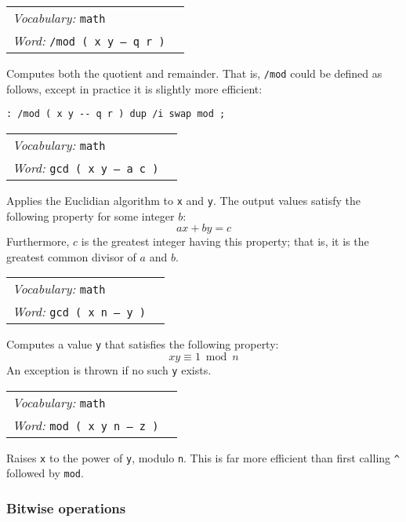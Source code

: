 \documentclass{book}
\newcommand{\hhat}{\symbol{94}}
\newcommand{\vocabulary}[1]{\emph{Vocabulary:} \texttt{#1}&\\}
\newcommand{\ordinaryword}[2]{\index{\texttt{#1}}\emph{Word:} \texttt{#2}&\\}
\newcommand{\wordtable}[1]{


\begin{tabularx}{12cm}{lX}
\hline
#1
\hline
\end{tabularx}

}
\begin{document}
\wordtable{
\vocabulary{math}
\ordinaryword{/mod}{/mod ( x y -- q r )}
}
Computes both the quotient and remainder. That is, \texttt{/mod} could be defined as follows, except in practice it is slightly more efficient:
\begin{verbatim}
: /mod ( x y -- q r ) dup /i swap mod ;
\end{verbatim}
\wordtable{
\vocabulary{math}
\ordinaryword{gcd}{gcd ( x y -- a c )}
}
Applies the Euclidian algorithm to \texttt{x} and \texttt{y}. The output values satisfy the following property for some integer $b$:
$$ax+by=c$$
Furthermore, $c$ is the greatest integer having this property; that is, it is the greatest common divisor of $a$ and $b$.
\wordtable{
\vocabulary{math}
\ordinaryword{mod-inv}{gcd ( x n -- y )}
}
Computes a value \texttt{y} that satisfies the following property:
$$xy \equiv 1 \bmod{n}$$ An exception is thrown if no such \texttt{y} exists.
\wordtable{
\vocabulary{math}
\ordinaryword{\hhat{}mod}{\hhat{}mod ( x y n -- z )}
}
Raises \texttt{x} to the power of \texttt{y}, modulo \texttt{n}. This is far more efficient than first calling \texttt{\^{}} followed by \texttt{mod}.

\subsubsection{Bitwise operations}\label{bitwise}
\end{document}
